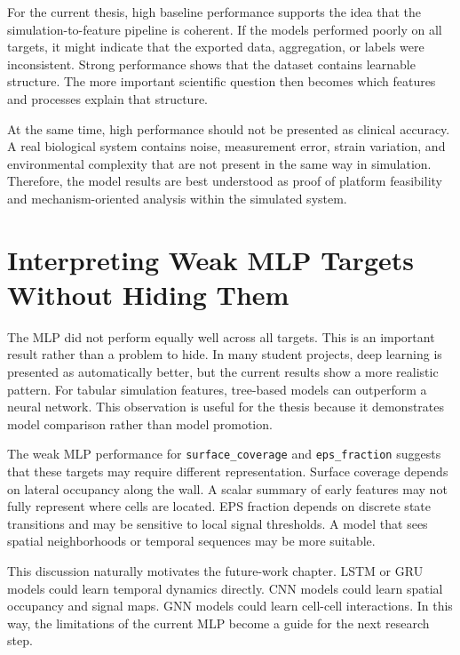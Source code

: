 \documentclass[12pt,a4paper,oneside]{report}
\begin{document}
For the current thesis, high baseline performance supports the idea that the simulation-to-feature pipeline is coherent. If the models performed poorly on all targets, it might indicate that the exported data, aggregation, or labels were inconsistent. Strong performance shows that the dataset contains learnable structure. The more important scientific question then becomes which features and processes explain that structure.

At the same time, high performance should not be presented as clinical accuracy. A real biological system contains noise, measurement error, strain variation, and environmental complexity that are not present in the same way in simulation. Therefore, the model results are best understood as proof of platform feasibility and mechanism-oriented analysis within the simulated system.

\section{Interpreting Weak MLP Targets Without Hiding Them}
The MLP did not perform equally well across all targets. This is an important result rather than a problem to hide. In many student projects, deep learning is presented as automatically better, but the current results show a more realistic pattern. For tabular simulation features, tree-based models can outperform a neural network. This observation is useful for the thesis because it demonstrates model comparison rather than model promotion.

The weak MLP performance for \texttt{surface\_coverage} and \texttt{eps\_fraction} suggests that these targets may require different representation. Surface coverage depends on lateral occupancy along the wall. A scalar summary of early features may not fully represent where cells are located. EPS fraction depends on discrete state transitions and may be sensitive to local signal thresholds. A model that sees spatial neighborhoods or temporal sequences may be more suitable.

This discussion naturally motivates the future-work chapter. LSTM or GRU models could learn temporal dynamics directly. CNN models could learn spatial occupancy and signal maps. GNN models could learn cell-cell interactions. In this way, the limitations of the current MLP become a guide for the next research step.
\end{document}
